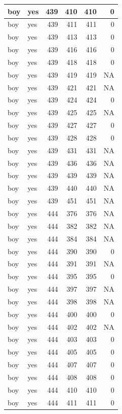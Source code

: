 \documentclass[man]{apa6}
\begin{document}
\begin{tabular}{l|l|r|r|r|r}
\hline
boy & yes & 439 & 410 & 410 & 0\\
\hline
boy & yes & 439 & 411 & 411 & 0\\
\hline
boy & yes & 439 & 413 & 413 & 0\\
\hline
boy & yes & 439 & 416 & 416 & 0\\
\hline
boy & yes & 439 & 418 & 418 & 0\\
\hline
boy & yes & 439 & 419 & 419 & NA\\
\hline
boy & yes & 439 & 421 & 421 & NA\\
\hline
boy & yes & 439 & 424 & 424 & 0\\
\hline
boy & yes & 439 & 425 & 425 & NA\\
\hline
boy & yes & 439 & 427 & 427 & 0\\
\hline
boy & yes & 439 & 428 & 428 & 0\\
\hline
boy & yes & 439 & 431 & 431 & NA\\
\hline
boy & yes & 439 & 436 & 436 & NA\\
\hline
boy & yes & 439 & 439 & 439 & NA\\
\hline
boy & yes & 439 & 440 & 440 & NA\\
\hline
boy & yes & 439 & 451 & 451 & NA\\
\hline
boy & yes & 444 & 376 & 376 & NA\\
\hline
boy & yes & 444 & 382 & 382 & NA\\
\hline
boy & yes & 444 & 384 & 384 & NA\\
\hline
boy & yes & 444 & 390 & 390 & 0\\
\hline
boy & yes & 444 & 391 & 391 & NA\\
\hline
boy & yes & 444 & 395 & 395 & 0\\
\hline
boy & yes & 444 & 397 & 397 & NA\\
\hline
boy & yes & 444 & 398 & 398 & NA\\
\hline
boy & yes & 444 & 400 & 400 & 0\\
\hline
boy & yes & 444 & 402 & 402 & NA\\
\hline
boy & yes & 444 & 403 & 403 & 0\\
\hline
boy & yes & 444 & 405 & 405 & 0\\
\hline
boy & yes & 444 & 407 & 407 & 0\\
\hline
boy & yes & 444 & 408 & 408 & 0\\
\hline
boy & yes & 444 & 410 & 410 & 0\\
\hline
boy & yes & 444 & 411 & 411 & 0\\

\end{tabular}
\end{document}

